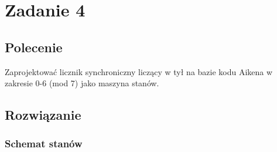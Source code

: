 \documentclass[a4paper,12pt]{extarticle}  %
\begin{document}
\section{Zadanie 4}
\subsection{Polecenie}
Zaprojektować licznik synchroniczny liczący w tył na bazie kodu Aikena w zakresie 0-6 (mod 7) jako maszyna stanów.
\subsection{Rozwiązanie}
\subsubsection{Schemat stanów}
\begin{figure}[H]
	\centering
\end{figure}
\end{document}
